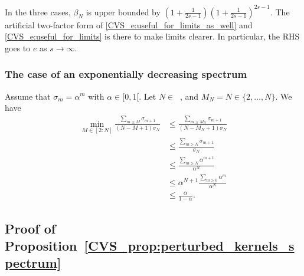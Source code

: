 \documentclass[twoside,11pt]{book}
\numberwithin{theorem}{chapter}
\numberwithin{definition}{chapter}
\numberwithin{proposition}{chapter}
\numberwithin{corollary}{chapter}
\numberwithin{example}{chapter}
\numberwithin{lemma}{chapter}
\numberwithin{assumption}{chapter}
\numberwithin{equation}{chapter}
\numberwithin{figure}{chapter}
\DeclareMathOperator{\Ns}{\mathbb{N}^{*}}
\begin{document}

In the three cases, $\beta_{N}$ is upper bounded by $\left(1+\frac{1}{2s-1}\right) \left(1+\frac{1}{2s-1}\right)^{2s-1}$. The artificial two-factor form of \eqref{CVS_e:useful_for_limits_as_well} and \eqref{CVS_e:useful_for_limits} is there to make limits clearer. In particular, the RHS goes to $e$ as $s\rightarrow \infty$.

\subsubsection{The case of an exponentially decreasing spectrum}
Assume that $\sigma_{m} = \alpha^{m}$ with $\alpha \in [0,1[$.
Let $N \in \Ns$, and $M_N = N \in \{ 2,\dots, N\}$.
We have
\begin{align}
\min_{M \in [2:N]}\frac{\sum_{m \geq M} \sigma_{m+1}}{(N-M+1)\sigma_N}
& \leq \frac{\sum_{m \geq M_N} \sigma_{m+1}}{(N-M_N+1)\sigma_N}\\
& \leq \frac{\sum_{m \geq N} \sigma_{m+1}}{\sigma_N}\\
& \leq \frac{\sum_{m \geq N} \alpha^{m+1}}{\alpha^{N}}\\
& \leq \alpha^{N+1}\frac{\sum_{m \geq 0} \alpha^{m}}{\alpha^{N}}\\
& \leq \frac{\alpha}{1-\alpha}.
\end{align}

\subsection{Proof of Proposition~\ref{CVS_prop:perturbed_kernels_spectrum}}\label{CVS_app:proof_perturbed_kernels_spectrum}
\end{document}
